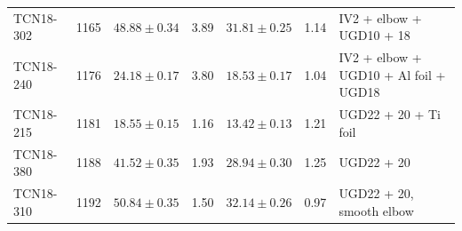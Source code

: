 \documentclass[10pt,letterpaper]{article}
\begin{document}
\begin{table}
{\begin{tabular}{l r r r r r p{}}
TCN18-302 & 1165 & $48.88 \pm 0.34$ & 3.89 & $31.81 \pm 0.25$ & 1.14 & IV2 + elbow + UGD10 + 18 \\
TCN18-240 & 1176 & $24.18 \pm 0.17$ & 3.80 & $18.53 \pm 0.17$ & 1.04 & IV2 + elbow + UGD10 + Al foil + UGD18 \\
TCN18-215 & 1181 & $18.55 \pm 0.15$ & 1.16 & $13.42 \pm 0.13$ & 1.21 & UGD22 + 20 + Ti foil \\
TCN18-380 & 1188 & $41.52 \pm 0.35$ & 1.93 & $28.94 \pm 0.30$ & 1.25 & UGD22 + 20 \\
TCN18-310 & 1192 & $50.84 \pm 0.35$ & 1.50 & $32.14 \pm 0.26$ & 0.97 & UGD22 + 20, smooth elbow \\
\bottomrule
\end{tabular}
}
\label{tab:transmission}
\end{table}
\end{document}
